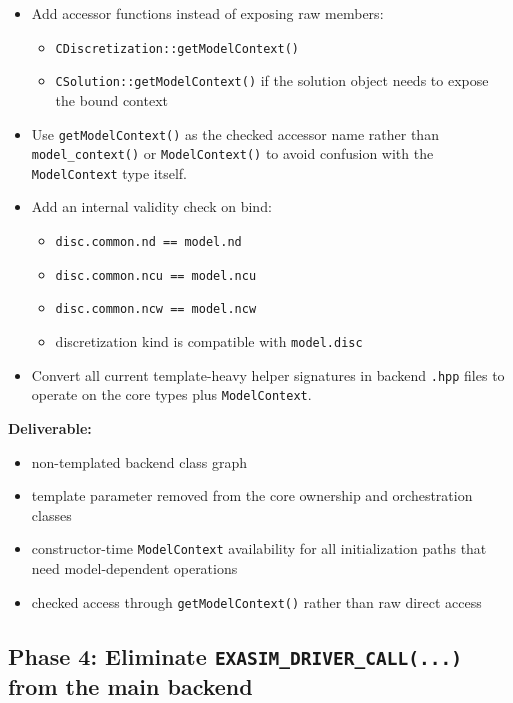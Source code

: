 \documentclass[11pt]{article}
\begin{document}
\begin{itemize}[leftmargin=*]
\item Add accessor functions instead of exposing raw members:
\begin{itemize}[leftmargin=*]
\item \texttt{CDiscretization::getModelContext()}
\item \texttt{CSolution::getModelContext()} if the solution object needs to expose the bound context
\end{itemize}
\item Use \texttt{getModelContext()} as the checked accessor name rather than \texttt{model\_context()} or \texttt{ModelContext()} to avoid confusion with the \texttt{ModelContext} type itself.
\item Add an internal validity check on bind:
\begin{itemize}[leftmargin=*]
\item \texttt{disc.common.nd == model.nd}
\item \texttt{disc.common.ncu == model.ncu}
\item \texttt{disc.common.ncw == model.ncw}
\item discretization kind is compatible with \texttt{model.disc}
\end{itemize}
\item Convert all current template-heavy helper signatures in backend \texttt{.hpp} files to operate on the core types plus \texttt{ModelContext}.
\end{itemize}

\textbf{Deliverable:}
\begin{itemize}[leftmargin=*]
\item non-templated backend class graph
\item template parameter removed from the core ownership and orchestration classes
\item constructor-time \texttt{ModelContext} availability for all initialization paths that need model-dependent operations
\item checked access through \texttt{getModelContext()} rather than raw direct access
\end{itemize}

\subsection*{Phase 4: Eliminate \texttt{EXASIM\_DRIVER\_CALL(...)} from the main backend}
\end{document}
